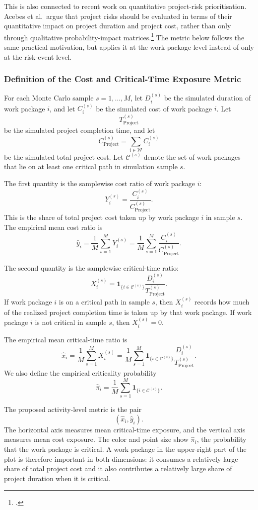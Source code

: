 \documentclass[11pt,a4paper]{article}
\providecommand{\cC}{\mathcal{C}}
\newcommand{\cC}{\mathcal{C}}
\newcommand{\cW}{\mathcal{W}}
\newcommand{\1}{\mathbf{1}}
\theoremstyle{definition}
\theoremstyle{plain}
\theoremstyle{remark}
\numberwithin{equation}{section}
\begin{document}
This is also connected to recent work on quantitative project-risk prioritisation. Acebes et al.\ argue that project risks should be evaluated in terms of their quantitative impact on project duration and project cost, rather than only through qualitative probability-impact matrices.\footcite{acebes2024beyondProbabilityImpactMatrices} The metric below follows the same practical motivation, but applies it at the work-package level instead of only at the risk-event level.

\subsubsection{Definition of the Cost and Critical-Time Exposure Metric}

For each Monte Carlo sample $s=1,\ldots,M$, let $D_i^{(s)}$ be the simulated duration of work package $i$, and let $C_i^{(s)}$ be the simulated cost of work package $i$. Let
\[
T_{\text{Project}}^{(s)}
\]
be the simulated project completion time, and let
\[
C_{\text{Project}}^{(s)}
=
\sum_{i\in\cW}C_i^{(s)}
\]
be the simulated total project cost. Let $\cC^{(s)}$ denote the set of work packages that lie on at least one critical path in simulation sample $s$.

The first quantity is the samplewise cost ratio of work package $i$:
\[
Y_i^{(s)}
=
\frac{C_i^{(s)}}{C_{\text{Project}}^{(s)}}.
\]
This is the share of total project cost taken up by work package $i$ in sample $s$. The empirical mean cost ratio is
\[
\widehat y_i
=
\frac{1}{M}\sum_{s=1}^{M}Y_i^{(s)}
=
\frac{1}{M}\sum_{s=1}^{M}
\frac{C_i^{(s)}}{C_{\text{Project}}^{(s)}}.
\]

The second quantity is the samplewise critical-time ratio:
\[
X_i^{(s)}
=
\1_{\{i\in\cC^{(s)}\}}
\frac{D_i^{(s)}}{T_{\text{Project}}^{(s)}}.
\]
If work package $i$ is on a critical path in sample $s$, then $X_i^{(s)}$ records how much of the realized project completion time is taken up by that work package. If work package $i$ is not critical in sample $s$, then $X_i^{(s)}=0$.

The empirical mean critical-time ratio is
\[
\widehat x_i
=
\frac{1}{M}\sum_{s=1}^{M}X_i^{(s)}
=
\frac{1}{M}
\sum_{s=1}^{M}
\1_{\{i\in\cC^{(s)}\}}
\frac{D_i^{(s)}}{T_{\text{Project}}^{(s)}}.
\]
We also define the empirical criticality probability
\[
\widehat \pi_i
=
\frac{1}{M}
\sum_{s=1}^{M}
\1_{\{i\in\cC^{(s)}\}}.
\]

The proposed activity-level metric is the pair
\[
(\widehat x_i,\widehat y_i).
\]
The horizontal axis measures mean critical-time exposure, and the vertical axis measures mean cost exposure. The color and point size show $\widehat\pi_i$, the probability that the work package is critical. A work package in the upper-right part of the plot is therefore important in both dimensions: it consumes a relatively large share of total project cost and it also contributes a relatively large share of project duration when it is critical.
\end{document}

